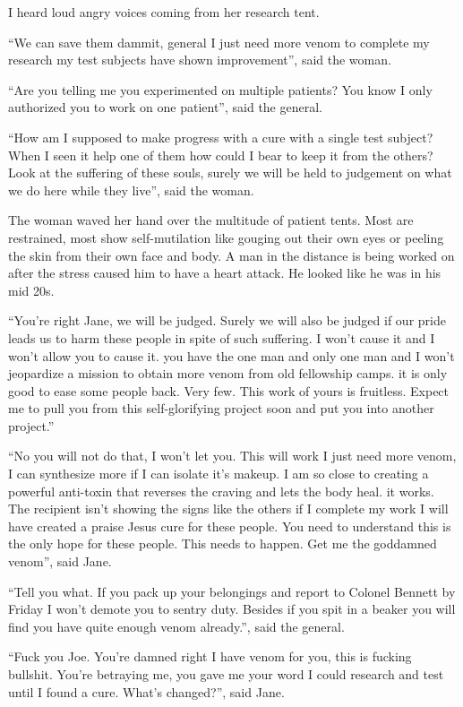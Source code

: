 I heard loud angry voices coming from her research tent. 

``We can save them dammit, general I just need more venom to complete my research my test subjects have shown improvement'', said the woman.

``Are you telling me you experimented on multiple patients? You know I only authorized you to work on one patient'', said the general.

``How am I supposed to make progress with a cure with a single test subject? When I seen it help one of them how could I bear to keep it from the others? Look at the suffering of these souls, surely we will be held to judgement on what we do here while they live'', said the woman.

The woman waved her hand over the multitude of patient tents. Most are restrained, most show self-mutilation like gouging out their own eyes or peeling the skin from their own face and body. A man in the distance is being worked on after the stress caused him to have a heart attack. He looked like he was in his mid 20s.

``You're right Jane, we will be judged. Surely we will also be judged if our pride leads us to harm these people in spite of such suffering. I won't cause it and I won't allow you to cause it. you have the one man and only one man and I won't jeopardize a mission to obtain more venom from old fellowship camps. it is only good to ease some people back. Very few. This work of yours is fruitless. Expect me to pull you from this self-glorifying project soon and put you into another project.''

``No you will not do that, I won't let you. This will work I just need more venom, I can synthesize more if I can isolate it's makeup. I am so close to creating a powerful anti-toxin that reverses the craving and lets the body heal. it works. The recipient isn't showing the signs like the others if I complete my work I will have created a praise Jesus cure for these people. You need to understand this is the only hope for these people. This needs to happen. Get me the goddamned venom'', said Jane.

``Tell you what. If you pack up your belongings and report to Colonel Bennett by Friday I won't demote you to sentry duty. Besides if you spit in a beaker you will find you have quite enough venom already.'', said the general.

``Fuck you Joe. You're damned right I have venom for you, this is fucking bullshit. You're betraying me, you gave me your word I could research and test until I found a cure. What's changed?'', said Jane.


